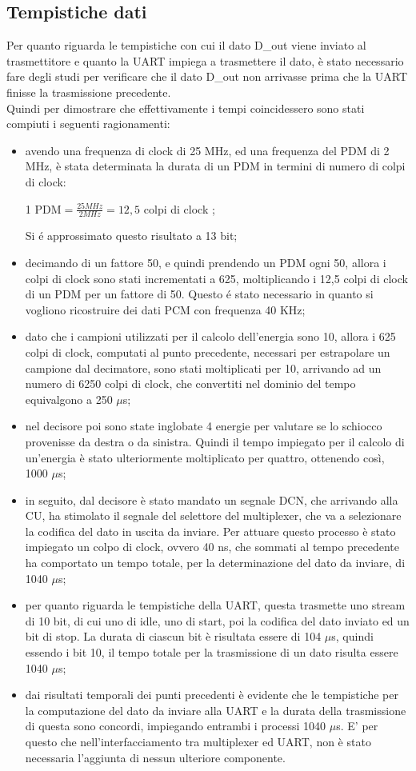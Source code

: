 \documentclass[a4paper, titlepage]{article}
\begin{document}
\subsection{Tempistiche dati}
Per quanto riguarda le tempistiche con cui il dato D\_out viene inviato al trasmettitore e quanto la UART impiega a trasmettere il dato, è stato necessario fare degli studi per verificare che il dato D\_out non arrivasse prima che la UART finisse la trasmissione precedente.\\Quindi per dimostrare che effettivamente i tempi coincidessero sono stati compiuti i seguenti ragionamenti:
\begin{itemize}
    \item avendo una frequenza di clock di 25 MHz, ed una frequenza del PDM di 2 MHz,  è stata determinata la durata di un PDM in termini di numero di colpi di clock:
    \begin{center}
     1 PDM$=\frac{25 MHz}{2 MHz}=12,5$ colpi di clock ; 
    \end{center}
    Si é approssimato questo risultato a 13 bit;
   \item decimando di un fattore 50, e quindi prendendo un PDM ogni 50, allora i colpi di clock sono stati incrementati a 625, moltiplicando i 12,5 colpi di clock di un PDM per un fattore di 50. Questo é stato necessario in quanto si vogliono ricostruire dei dati PCM con frequenza 40 KHz;
   \item dato che i campioni utilizzati per il calcolo dell'energia sono 10, allora i 625 colpi di clock, computati al punto precedente, necessari per estrapolare un campione dal decimatore, sono stati moltiplicati per 10, arrivando ad un numero di 6250 colpi di clock, che convertiti nel dominio del tempo equivalgono a 250 $\mu$s;
   \item nel decisore poi sono state inglobate 4 energie per valutare se lo schiocco provenisse da destra o da sinistra. Quindi il tempo impiegato per il calcolo di un'energia è stato ulteriormente moltiplicato per quattro, ottenendo così, 1000 $\mu$s;
   \item in seguito, dal decisore è stato mandato un segnale DCN, che arrivando alla CU, ha stimolato il segnale del selettore del multiplexer, che va a selezionare la codifica del dato in uscita da inviare. Per attuare questo processo è stato impiegato un colpo di clock, ovvero 40 ns, che sommati al tempo precedente ha comportato un tempo totale, per la determinazione del dato da inviare, di 1040  $\mu$s;
   \item per quanto riguarda le tempistiche della UART, questa trasmette uno stream di 10 bit, di cui uno di idle, uno di start, poi la codifica del dato inviato ed un bit di stop. La durata di ciascun bit è risultata essere di 104  $\mu$s, quindi essendo i bit 10, il tempo totale per la trasmissione di un dato risulta essere 1040  $\mu$s;
   \item dai risultati temporali dei punti precedenti è evidente che le tempistiche per la computazione del dato da inviare alla UART e la durata della trasmissione di questa sono concordi, impiegando entrambi i processi 1040  $\mu$s. E' per questo che nell'interfacciamento tra multiplexer ed UART, non è stato necessaria l'aggiunta di nessun ulteriore componente.
\end{itemize}
\end{document}
